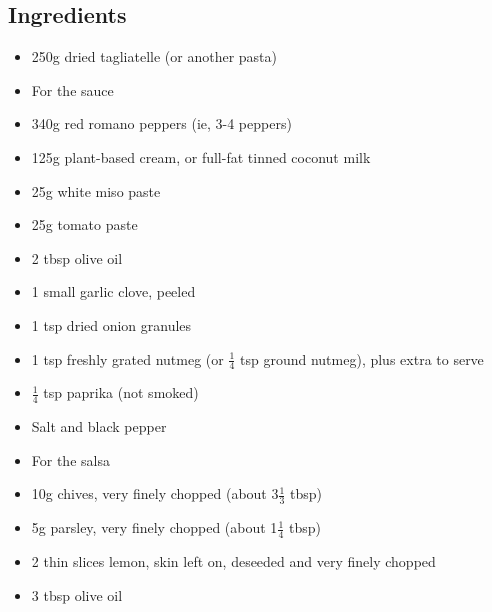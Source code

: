 \documentclass{book}
\begin{document}
\subsection*{Ingredients}
\begin{itemize}
\item 250g dried tagliatelle (or another pasta)
\end{itemize}

\begin{itemize}
\item For the sauce
\item 340g red romano peppers (ie, 3-4 peppers)
\item 125g plant-based cream, or full-fat tinned coconut milk
\item 25g white miso paste
\item 25g tomato paste 
\item 2 tbsp olive oil 
\item 1 small garlic clove, peeled
\item 1 tsp dried onion granules
\item 1 tsp freshly grated nutmeg (or $\frac{1}{4}$ tsp ground nutmeg), plus extra to serve
\item $\frac{1}{4}$ tsp paprika (not smoked)
\item Salt and black pepper
\end{itemize}

\begin{itemize}
\item For the salsa
\item 10g chives, very finely chopped (about 3$\frac{1}{3}$ tbsp)
\item 5g parsley, very finely chopped (about 1$\frac{1}{4}$ tbsp)
\item 2 thin slices lemon, skin left on, deseeded and very finely chopped
\item 3 tbsp olive oil
\end{itemize}
\end{document}
